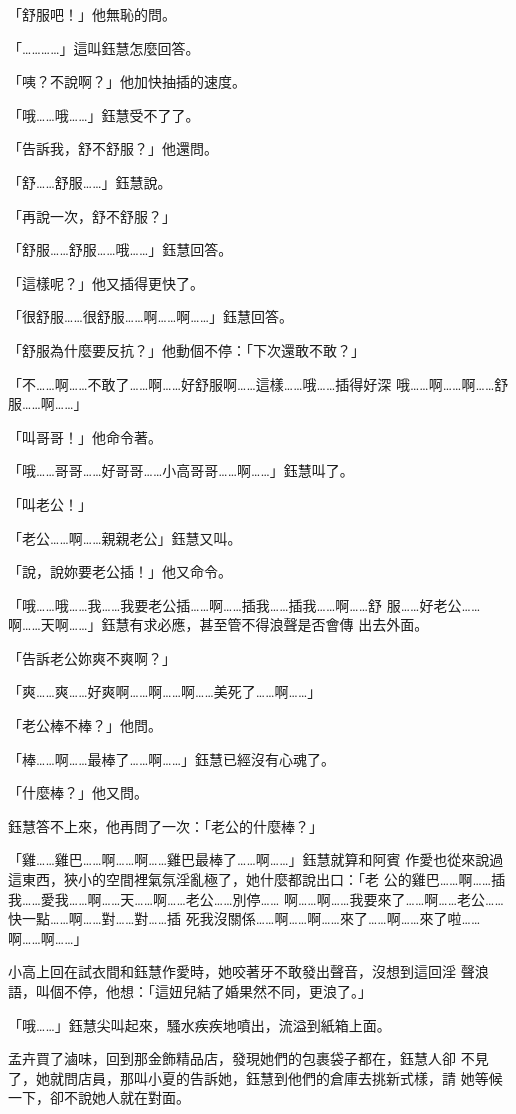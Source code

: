 「舒服吧！」他無恥的問。

「…………」這叫鈺慧怎麼回答。

「咦？不說啊？」他加快抽插的速度。

「哦……哦……」鈺慧受不了了。

「告訴我，舒不舒服？」他還問。

「舒……舒服……」鈺慧說。

「再說一次，舒不舒服？」

「舒服……舒服……哦……」鈺慧回答。

「這樣呢？」他又插得更快了。

「很舒服……很舒服……啊……啊……」鈺慧回答。

「舒服為什麼要反抗？」他動個不停：「下次還敢不敢？」

「不……啊……不敢了……啊……好舒服啊……這樣……哦……插得好深
哦……啊……啊……舒服……啊……」

「叫哥哥！」他命令著。

「哦……哥哥……好哥哥……小高哥哥……啊……」鈺慧叫了。

「叫老公！」

「老公……啊……親親老公」鈺慧又叫。

「說，說妳要老公插！」他又命令。

「哦……哦……我……我要老公插……啊……插我……插我……啊……舒
服……好老公……啊……天啊……」鈺慧有求必應，甚至管不得浪聲是否會傳
出去外面。

「告訴老公妳爽不爽啊？」

「爽……爽……好爽啊……啊……啊……美死了……啊……」

「老公棒不棒？」他問。

「棒……啊……最棒了……啊……」鈺慧已經沒有心魂了。

「什麼棒？」他又問。

鈺慧答不上來，他再問了一次：「老公的什麼棒？」

「雞……雞巴……啊……啊……雞巴最棒了……啊……」鈺慧就算和阿賓
作愛也從來說過這東西，狹小的空間裡氣氛淫亂極了，她什麼都說出口：「老
公的雞巴……啊……插我……愛我……啊……天……啊……老公……別停……
啊……啊……我要來了……啊……老公……快一點……啊……對……對……插
死我沒關係……啊……啊……來了……啊……來了啦……啊……啊……」

小高上回在試衣間和鈺慧作愛時，她咬著牙不敢發出聲音，沒想到這回淫
聲浪語，叫個不停，他想：「這妞兒結了婚果然不同，更浪了。」

「哦……」鈺慧尖叫起來，騷水疾疾地噴出，流溢到紙箱上面。

孟卉買了滷味，回到那金飾精品店，發現她們的包裹袋子都在，鈺慧人卻
不見了，她就問店員，那叫小夏的告訴她，鈺慧到他們的倉庫去挑新式樣，請
她等候一下，卻不說她人就在對面。

